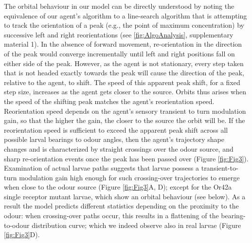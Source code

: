 \documentclass[10pt,a4paper]{article}
\begin{document}
The orbital behaviour in our model can be directly understood by noting the equivalence of our agent's algorithm to a line-search algorithm that is attempting to track the orientation of a peak (e.g., the point of maximum concentration) by successive left and right reorientations (see \ref{fig:AlgoAnalysis}, supplementary material 1). In the absence of forward movement, re-orientation in the direction of the peak would converge incrementally until left and right positions fall on either side of the peak. However, as the agent is not stationary, every step taken that is not headed exactly towards the peak will cause the direction of the peak, relative to the agent, to shift. The speed of this apparent peak shift, for a fixed step size, increases as the agent gets closer to the source. Orbits thus arises when the speed of the shifting peak matches the agent's reorientation speed. Reorientation speed depends on the agent's sensory transient to turn modulation gain, so that the higher the gain, the closer to the source the orbit will be. If the reorientation speed is sufficient to exceed the apparent peak shift across all possible larval bearings to odour angles, then the agent's trajectory shape changes and is characterized by straight crossings over the odour source, and sharp re-orientation events once the peak has been passed over (Figure \ref{fig:Fig3}). Examination of actual larvae paths suggests that larvae possess a transient-to-turn modulation gain high enough for such crossing-over trajectories to emerge when close to the odour source (Figure \ref{fig:Fig3}A, D); except for the Or42a single receptor mutant larvae, which show an orbital behaviour (see below). As a result the model predicts different statistics depending on the proximity to the odour: when crossing-over paths occur, this results in a flattening of the bearing-to-odour distribution curve; which we indeed observe also in real larvae (Figure \ref{fig:Fig3}D). 
\end{document}
